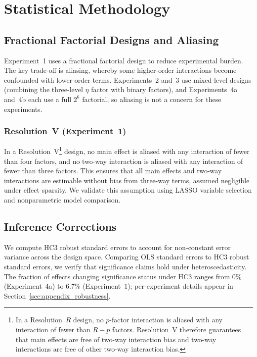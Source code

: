 \section{Statistical Methodology}
\label{sec:appendix_inference}

\subsection{Fractional Factorial Designs and Aliasing}

Experiment~1 uses a fractional factorial design to reduce experimental burden. The key trade-off is aliasing, whereby some higher-order interactions become confounded with lower-order terms. Experiments~2 and~3 use mixed-level designs (combining the three-level $\eta$ factor with binary factors), and Experiments~4a and~4b each use a full $2^6$ factorial, so aliasing is not a concern for these experiments.

\subsubsection{Resolution~V (Experiment~1)}

In a Resolution~V\footnote{In a Resolution~$R$ design, no $p$-factor interaction is aliased with any interaction of fewer than $R - p$ factors. Resolution~V therefore guarantees that main effects are free of two-way interaction bias and two-way interactions are free of other two-way interaction bias.} design, no main effect is aliased with any interaction of fewer than four factors, and no two-way interaction is aliased with any interaction of fewer than three factors. This ensures that all main effects and two-way interactions are estimable without bias from three-way terms, assumed negligible under effect sparsity. We validate this assumption using LASSO variable selection and nonparametric model comparison.

\subsection{Inference Corrections}

We compute HC3 robust standard errors \citep{MacKinnonWhite1985} to account for non-constant error variance across the design space. Comparing OLS standard errors to HC3 robust standard errors, we verify that significance claims hold under heteroscedasticity. The fraction of effects changing significance status under HC3 ranges from 0\% (Experiment~4a) to 6.7\% (Experiment~1); per-experiment details appear in Section~\ref{sec:appendix_robustness}.

